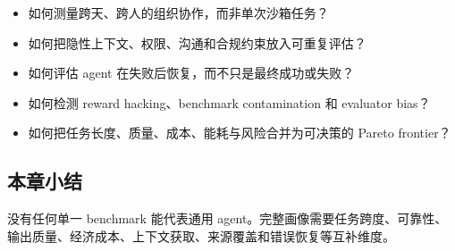 \begin{itemize}
    \item 如何测量跨天、跨人的组织协作，而非单次沙箱任务？
    \item 如何把隐性上下文、权限、沟通和合规约束放入可重复评估？
    \item 如何评估 agent 在失败后恢复，而不只是最终成功或失败？
    \item 如何检测 reward hacking、benchmark contamination 和 evaluator bias？
    \item 如何把任务长度、质量、成本、能耗与风险合并为可决策的 Pareto frontier？
\end{itemize}

\subsection{本章小结}

没有任何单一 benchmark 能代表通用 agent。完整画像需要任务跨度、可靠性、输出质量、经济成本、上下文获取、来源覆盖和错误恢复等互补维度。

